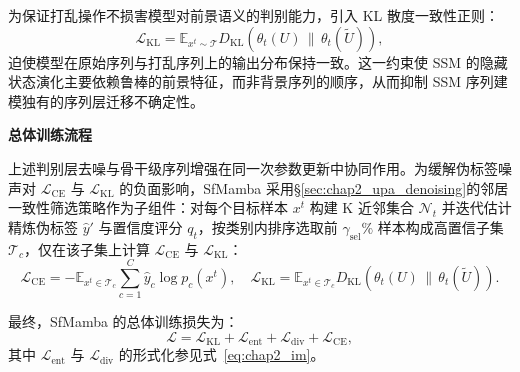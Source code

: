 为保证打乱操作不损害模型对前景语义的判别能力，引入 KL 散度一致性正则：
\begin{equation}
\mathcal{L}_{\text{KL}} = \mathbb{E}_{x^t \sim \mathcal{T}} D_{\text{KL}}\!\left(\theta_t(U) \,\|\, \theta_t(\tilde{U})\right),
\label{eq:kl_loss}
\end{equation}
迫使模型在原始序列与打乱序列上的输出分布保持一致。这一约束使 SSM 的隐藏状态演化主要依赖鲁棒的前景特征，而非背景序列的顺序，从而抑制 SSM 序列建模独有的序列层迁移不确定性。





\noindent\textbf{总体训练流程}

\label{sec:chap2_sfmamba_training}

上述判别层去噪与骨干级序列增强在同一次参数更新中协同作用。为缓解伪标签噪声对 $\mathcal{L}_{\text{CE}}$ 与 $\mathcal{L}_{\text{KL}}$ 的负面影响，SfMamba 采用§\ref{sec:chap2_upa_denoising}的邻居一致性筛选策略作为子组件：对每个目标样本 $x^t$ 构建 K 近邻集合 $\mathcal{N}_t$ 并迭代估计精炼伪标签 $\hat{y}'$ 与置信度评分 $q_t$，按类别内排序选取前 $\gamma_{\text{sel}}\%$ 样本构成高置信子集 $\mathcal{T}_c$，仅在该子集上计算 $\mathcal{L}_{\text{CE}}$ 与 $\mathcal{L}_{\text{KL}}$：
\begin{equation}
\mathcal{L}_{\text{CE}} = -\mathbb{E}_{x^t \in \mathcal{T}_c} \sum_{c=1}^{C} \hat{y}_c \log p_c(x^t), \quad
\mathcal{L}_{\text{KL}} = \mathbb{E}_{x^t \in \mathcal{T}_c} D_{\text{KL}}\!\left(\theta_t(U) \,\|\, \theta_t(\tilde{U})\right).
\label{eq:scs_loss_ch}
\end{equation}

最终，SfMamba 的总体训练损失为：
\begin{equation}
\mathcal{L} = \mathcal{L}_{\text{KL}} + \mathcal{L}_{\text{ent}} + \mathcal{L}_{\text{div}} + \mathcal{L}_{\text{CE}},
\label{eq:scs_total_loss}
\end{equation}
其中 $\mathcal{L}_{\text{ent}}$ 与 $\mathcal{L}_{\text{div}}$ 的形式化参见式~\eqref{eq:chap2_im}。

